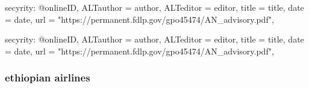 {{%


secyrity:
@online{ID,	ALTauthor = {author},	ALTeditor = {editor},	title = {title},	date = {date},	url = {"https://permanent.fdlp.gov/gpo45474/AN_advisory.pdf"},}


secyrity:
@online{ID,	ALTauthor = {author},	ALTeditor = {editor},	title = {title},	date = {date},	url = {"https://permanent.fdlp.gov/gpo45474/AN_advisory.pdf"},}



\subsubsection{ethiopian airlines}

}}
